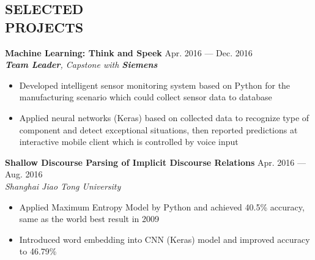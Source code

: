 \documentclass[margin,line,10pt]{res}
\begin{document}
\begin{resume}
\section{SELECTED\\PROJECTS}
{
\small
{\bf Machine Learning: Think and Speek} \hfill Apr. 2016 --- Dec. 2016\\
{\it \textbf{Team Leader}, Capstone with {\bf Siemens}}
}
\begin{itemize}
\setlength{\itemsep}{0pt}
\setlength{\parskip}{0pt}
\setlength{\parsep}{0pt}
\item {\small Developed intelligent sensor monitoring system based on Python for the manufacturing scenario which could collect sensor data to database}
\item {\small Applied neural networks (Keras) based on collected data to recognize type of component and detect exceptional situations, then reported predictions at interactive mobile client which is controlled by voice input}
\end{itemize}
\vspace{-.1 in}
{
\small
{\bf Shallow Discourse Parsing of Implicit Discourse Relations} \hfill Apr. 2016 ---  Aug. 2016\\
{\it Shanghai Jiao Tong University}
}
\begin{itemize}
\setlength{\itemsep}{0pt}
\setlength{\parskip}{0pt}
\setlength{\parsep}{0pt}
\item {\small Applied Maximum Entropy Model by Python and achieved 40.5\% accuracy, same as the world best result in 2009}
\item {\small Introduced word embedding into CNN (Keras) model and improved accuracy to 46.79\%}
\end{itemize}
\vspace{-.1 in}


\end{resume}
\end{document}
